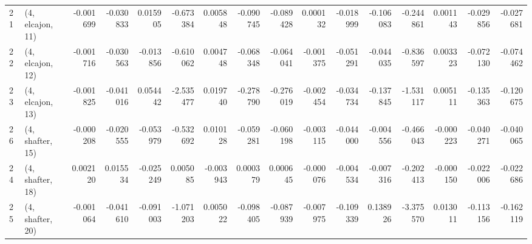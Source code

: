 \begin{tabular}{llrrrrrrrrrrrrrr}
21 &  (4, elcajon, 11) &  -0.001699 & -0.030833 &  0.015905 &  -0.673384 &  0.005848 &  -0.090745 & -0.089428 &  0.000132 & -0.018999 & -0.106083 &  -0.244861 &  0.001143 & -0.029856 & -0.027681 \\
22 &  (4, elcajon, 12) &  -0.001716 & -0.030563 & -0.013856 &  -0.610062 &  0.004748 &  -0.068348 & -0.064041 & -0.001375 & -0.051291 & -0.044035 &  -0.836597 &  0.003323 & -0.072130 & -0.074462 \\
23 &  (4, elcajon, 13) &  -0.001825 & -0.041016 &  0.054442 &  -2.535477 &  0.019740 &  -0.278790 & -0.276019 & -0.002454 & -0.034734 & -0.137845 &  -1.531117 &  0.005111 & -0.135363 & -0.120675 \\
26 &  (4, shafter, 15) &  -0.000208 & -0.020555 & -0.053979 &  -0.532692 &  0.010128 &  -0.059281 & -0.060198 & -0.003115 & -0.044000 & -0.004556 &  -0.466043 & -0.000223 & -0.040271 & -0.040065 \\
24 &  (4, shafter, 18) &   0.002120 &  0.015534 & -0.025249 &   0.005085 & -0.003943 &   0.000379 &  0.000645 & -0.000076 & -0.004534 & -0.007316 &  -0.202413 & -0.000150 & -0.022006 & -0.022686 \\
25 &  (4, shafter, 20) &  -0.001064 & -0.041610 & -0.091003 &  -1.071203 &  0.005022 &  -0.098405 & -0.087939 & -0.007975 & -0.109339 &  0.138926 &  -3.375570 &  0.013011 & -0.113156 & -0.162119 \\
\bottomrule
\end{tabular}
